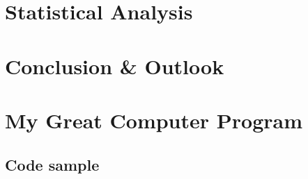 \documentclass[12pt]{report}
\begin{document}
\begin{figure}[h]
\end{figure}




\chapter{Statistical Analysis}

\chapter{Conclusion \& Outlook}




\appendix
\chapter{My Great Computer Program}

\section{Code sample}


\end{document}
